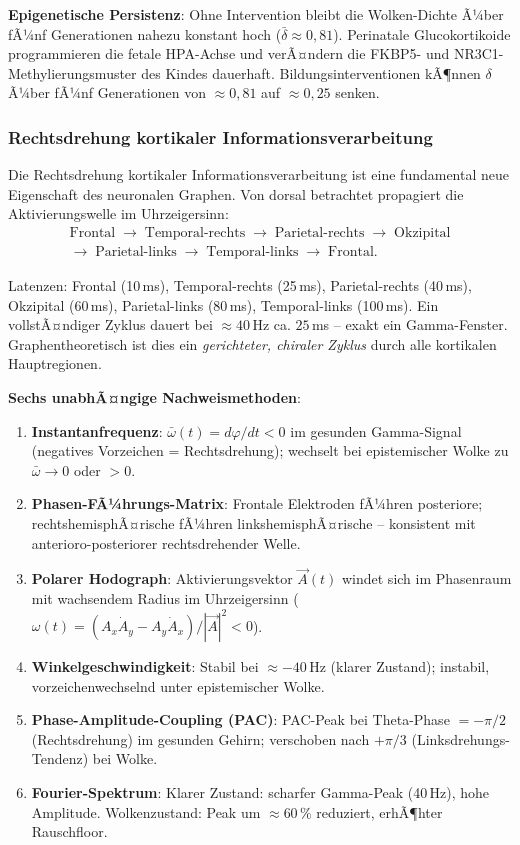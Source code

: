 ﻿\documentclass[a4paper,12pt]{article}
\theoremstyle{definition}
\begin{document}
	\textbf{Epigenetische Persistenz}: Ohne Intervention bleibt die Wolken-Dichte Ã¼ber fÃ¼nf Generationen nahezu konstant hoch ($\bar{\delta} \approx 0{,}81$). Perinatale Glucokortikoide programmieren die fetale HPA-Achse und verÃ¤ndern die FKBP5- und NR3C1-Methylierungsmuster des Kindes dauerhaft. Bildungsinterventionen kÃ¶nnen $\delta$ Ã¼ber fÃ¼nf Generationen von $\approx 0{,}81$ auf $\approx 0{,}25$ senken.

	\subsubsection{Rechtsdrehung kortikaler Informationsverarbeitung}

	Die Rechtsdrehung kortikaler Informationsverarbeitung ist eine fundamental neue Eigenschaft des neuronalen Graphen. Von dorsal betrachtet propagiert die Aktivierungswelle im Uhrzeigersinn:
	\begin{multline*}
		\text{Frontal} \;\to\; \text{Temporal-rechts} \;\to\; \text{Parietal-rechts} \;\to\; \text{Okzipital} \\
		\to\; \text{Parietal-links} \;\to\; \text{Temporal-links} \;\to\; \text{Frontal.}
	\end{multline*}

	Latenzen: Frontal (10\,ms), Temporal-rechts (25\,ms), Parietal-rechts (40\,ms), Okzipital (60\,ms), Parietal-links (80\,ms), Temporal-links (100\,ms). Ein vollstÃ¤ndiger Zyklus dauert bei $\approx 40$\,Hz ca. $25$\,ms -- exakt ein Gamma-Fenster. Graphentheoretisch ist dies ein \emph{gerichteter, chiraler Zyklus} durch alle kortikalen Hauptregionen.

	\textbf{Sechs unabhÃ¤ngige Nachweismethoden}:
	\begin{enumerate}
		\item \textbf{Instantanfrequenz}: $\bar{\omega}(t) = d\varphi/dt < 0$ im gesunden Gamma-Signal (negatives Vorzeichen = Rechtsdrehung); wechselt bei epistemischer Wolke zu $\bar{\omega} \to 0$ oder $>0$.
		\item \textbf{Phasen-FÃ¼hrungs-Matrix}: Frontale Elektroden fÃ¼hren posteriore; rechtshemisphÃ¤\-rische fÃ¼hren linkshemisphÃ¤rische -- konsistent mit anterioro-posteriorer rechtsdrehender Welle.
		\item \textbf{Polarer Hodograph}: Aktivierungsvektor $\vec{A}(t)$ windet sich im Phasenraum mit wachsendem Radius im Uhrzeigersinn ($\omega(t) = (A_x\dot{A}_y - A_y\dot{A}_x)/|\vec{A}|^2 < 0$).
		\item \textbf{Winkelgeschwindigkeit}: Stabil bei $\approx -40$\,Hz (klarer Zustand); instabil, vorzeichenwechselnd unter epistemischer Wolke.
		\item \textbf{Phase-Amplitude-Coupling (PAC)}: PAC-Peak bei Theta-Phase $= -\pi/2$ (Rechtsdrehung) im gesunden Gehirn; verschoben nach $+\pi/3$ (Linksdrehungs-Tendenz) bei Wolke.
		\item \textbf{Fourier-Spektrum}: Klarer Zustand: scharfer Gamma-Peak (40\,Hz), hohe Amplitude. Wolkenzustand: Peak um $\approx 60\,\%$ reduziert, erhÃ¶hter Rauschfloor.
	\end{enumerate}
\end{document}
